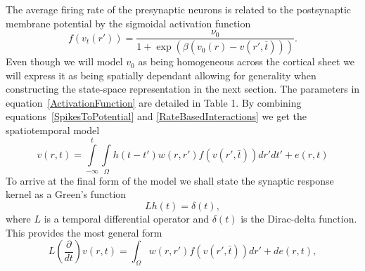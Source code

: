 \documentclass[onecolumn,draftcls]{IEEEtran}
\begin{document}
The average firing rate of the presynaptic neurons is related to the postsynaptic membrane potential by the sigmoidal activation function
\begin{equation}\label{ActivationFunction}
f\left( {{v_t}\left( {r'} \right)} \right) = \frac{{{\nu _0}}}{{1 + \exp \left( {\beta \left( {{v_0}\left( r \right) - {v}\left(r',\bar{t} \right)} \right)} \right)}}.
\end{equation}
Even though we will model  $v_0$ as being homogeneous across the cortical sheet we will express it as being spatially dependant allowing for generality when constructing the state-space representation in the next section. The parameters in equation~\ref{ActivationFunction} are detailed in Table 1. By combining equations~\ref{SpikesToPotential} and \ref{RateBasedInteractions} we get the spatiotemporal model
\begin{equation}\label{FullDoubleIntModel}
v\left(r,t\right) = \int\limits_{-\infty}^t\int\limits_\Omega  h\left(t - t'\right)w\left(r,r'\right)f\left( v\left( r',\bar t \right)\right)dr' dt'+e\left(r,t\right)
\end{equation}
To arrive at the final form of the model we shall state the synaptic response kernel as a Green's function
\begin{equation}\label{GreensFuncDef}
Lh\left( t \right) = \delta \left( t \right),
\end{equation}
where $L$ is a temporal differential operator and $\delta(t)$ is the Dirac-delta function. This provides the most general form
\begin{equation}\label{GenForm}
L\left( \frac{\partial }{dt} \right)v\left( {r,t} \right) = \int_\Omega  {w\left( {r,r'} \right)f\left( {v\left( {r',\bar t} \right)} \right)dr'}  + de\left( r,t \right),
\end{equation}
\end{document}
